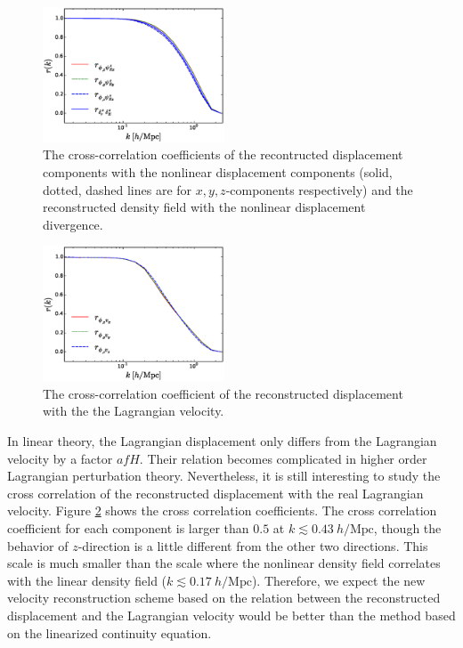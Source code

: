 \documentclass[aps,prd,twocolumn,superscriptaddress,groupedaddress,nofootinbib,amsfont]{revtex4}  %
\newcommand{\mr}{\mathrm}
\begin{document}
\begin{figure}[tbp]
\begin{center}
\includegraphics[width=0.48\textwidth]{fb.eps}
\end{center}
\vspace{-0.7cm}
\caption{The cross-correlation coefficients of the recontructed displacement
    components with the nonlinear displacement components (solid, dotted, dashed
    lines are for $x,y,z$-components respectively) and the reconstructed
density field with the nonlinear displacement divergence.}
\label{fig:cc_disp}
\end{figure}

\begin{figure}[tbp]
\begin{center}
\includegraphics[width=0.48\textwidth]{fc.eps}
\end{center}
\vspace{-0.7cm}
\caption{The cross-correlation coefficient of the reconstructed displacement
with the the Lagrangian velocity.}
\label{fig:cc_vel}
\end{figure}

In linear theory, the Lagrangian displacement only differs from the Lagrangian 
velocity by a factor $afH$. Their relation becomes complicated in higher order
Lagrangian perturbation theory. 
Nevertheless, it is still interesting to study the cross correlation of the 
reconstructed displacement with the real Lagrangian velocity.
Figure \ref{fig:cc_vel} shows the cross correlation coefficients. 
The cross correlation coefficient for each component is larger than $0.5$ at
$k\lesssim0.43\ h/\mr{Mpc}$, though the behavior of $z$-direction is a little
different from the other two directions.
This scale is much smaller than the scale where the nonlinear density field 
correlates with the linear density field ($k\lesssim0.17\ h/\mr{Mpc}$).
Therefore, we expect the new velocity reconstruction scheme based on the 
relation between the reconstructed displacement and the Lagrangian velocity
would be better than the method based on the linearized continuity equation.
\end{document}
